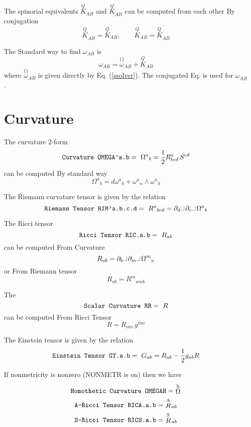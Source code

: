 \documentclass[twoside,openright]{report}
\newcommand{\grgtt}{\ttfamily}
\newcommand{\rim}[1]{\stackrel{\scriptscriptstyle\{\}}{#1}\!}
\newcommand{\object}[2]{%
\begin{equation}
\mbox{\comm{#1}} =\ #2
\end{equation}}
\newcommand{\RR}[1]{\stackrel{\rm #1}{R}\!{}}
\newcommand{\OO}[1]{\stackrel{\rm #1}{\Omega}\!{}}
\newcommand{\ipr}{\rule{1.8mm}{.1mm}\rule{.1mm}{2.2mm}\,} %
\renewcommand{\tt}{\grgtt}
\newcommand{\comm}[1]{{\upshape\tt#1}}    %
\begin{document}
The spinorial equivalents
$\stackrel{\scriptscriptstyle Q}{K}_{AB}$ and $\stackrel{\scriptscriptstyle Q}{K}_{\dot A\dot B}$
can be computed from
each other {\tt By conjugation}
\begin{equation}
\stackrel{\scriptscriptstyle Q}{K}_{\dot A\dot B}=\overline{\stackrel{\scriptscriptstyle Q}{K}_{AB}},\qquad
\stackrel{\scriptscriptstyle Q}{K}_{AB}=\overline{\stackrel{\scriptscriptstyle Q}{K}_{\dot A\dot B}}
\end{equation}

The {\tt Standard way} to find $\omega_{AB}$ is
\begin{equation}
\omega_{AB} = \rim{\omega}_{AB}+\stackrel{\scriptscriptstyle Q}{K}_{AB}
\end{equation}
where $\rim{\omega}_{AB}$ is given directly by Eq. (\ref{ssolver}).
The conjugated Eq. is used for $\omega_{\dot A\dot B}$.


\section{Curvature}

The curvature 2-form
\object{Curvature OMEGA'a.b}{\Omega^a{}_b=
\frac{1}{2}R^a_{bcd}\,S^{cd}}
can be computed {\tt By standard way}
\begin{equation}
\Omega^a{}_b = d\omega^a{}_b + \omega^a{}_n \wedge \omega^n{}_b \label{omes}
\end{equation}

The Riemann curvature tensor is given by the relation
\object{Riemann Tensor  RIM'a.b.c.d}{R^a{}_{bcd}=
\partial_d\ipr\partial_c\ipr\Omega^a{}_b}

The Ricci tensor
\object{Ricci Tensor RIC.a.b}{R_{ab}}
can be computed {\tt From Curvature}
\begin{equation}
R_{ab} = \partial_b\ipr\partial_m\ipr\Omega^m{}_a \label{rics}
\end{equation}
or {\tt From Riemann tensor}
\begin{equation}
R_{ab} = R^m{}_{amb}
\end{equation}

The
\object{Scalar Curvature RR}{R}
can be computed {\tt From Ricci Tensor}
\begin{equation}
R = R_{mn}\,g^{mn}
\end{equation}

The Einstein tensor is given by the relation
\object{Einstein Tensor GT.a.b}{G_{ab}=R_{ab}-\frac{1}{2}g_{ab}R}

If nonmetricity is nonzero (\comm{NONMETR} is on) then we have
\object{Homothetic Curvature  OMEGAH}{\OO{h}}
\object{A-Ricci Tensor RICA.a.b}{\RR{A}_{ab}}
\object{S-Ricci Tensor RICS.a.b}{\RR{S}_{ab}}
\end{document}
